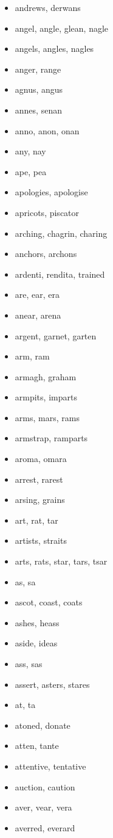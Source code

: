 \documentclass[a4wide,11pt]{report}
\begin{document}
\begin{itemize}
  \item andrews, derwans
  \item angel, angle, glean, nagle
  \item angels, angles, nagles
  \item anger, range
  \item agnus, angus
  \item annes, senan
  \item anno, anon, onan
  \item any, nay
  \item ape, pea
  \item apologies, apologise
  \item apricots, piscator
  \item arching, chagrin, charing
  \item anchors, archons
  \item ardenti, rendita, trained
  \item are, ear, era
  \item anear, arena
  \item argent, garnet, garten
  \item arm, ram
  \item armagh, graham
  \item armpits, imparts
  \item arms, mars, rams
  \item armstrap, ramparts
  \item aroma, omara
  \item arrest, rarest
  \item arsing, grains
  \item art, rat, tar
  \item artists, straits
  \item arts, rats, star, tars, tsar
  \item as, sa
  \item ascot, coast, coats
  \item ashes, heass
  \item aside, ideas
  \item ass, sas
  \item assert, asters, stares
  \item at, ta
  \item atoned, donate
  \item atten, tante
  \item attentive, tentative
  \item auction, caution
  \item aver, vear, vera
  \item averred, everard

\end{itemize}
\end{document}
